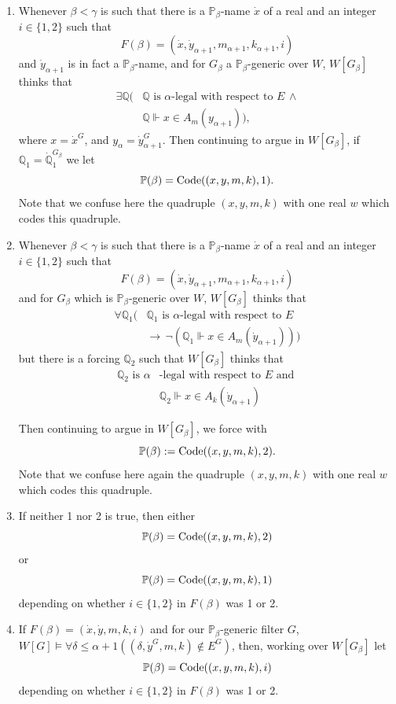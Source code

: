\documentclass[a4paper,11pt]{article}
\newcommand{\forceP}{\mathbb{P}}
\newcommand{\forceQ}{\mathbb{Q}}
\begin{document}
\begin{enumerate}
\item Whenever $\beta < \gamma $ is such that there is a $\forceP_{\beta}$-name $\dot{x}$ of a real and an integer $ i\in\{1,2\}$ such that
\[F(\beta)= (\dot{x},\dot{y}_{\alpha+1},m_{\alpha+1},k_{\alpha+1},i)\] and $\dot{y}_{\alpha+1}$ is in fact a $\forceP_{\beta}$-name, and for $G_{\beta}$  a $\forceP_{\beta}$-generic over $W$, $W[G_{\beta}]$ thinks that
\begin{align*}
\exists \forceQ (&\forceQ \text{ is } \alpha \text{-legal with respect to } E \,  \land \\& \forceQ \Vdash x \in A_m({y}_{\alpha+1})),
\end{align*}
where $x=\dot{x}^G$, and $y_{\alpha}=\dot{y}_{\alpha+1}^G$.
Then continuing to argue in $W[G_{\beta}]$, if ${\forceQ}_1=\dot{\forceQ}_1^{G_{\beta}}$ we let
\[\forceP(\beta)= \hbox{Code}((x,y,m,k),1). \]  Note that we confuse here the quadruple $(x,y,m,k)$ with one real $w$ which codes this quadruple.

\item
Whenever $\beta < \gamma $ is such that there is a $\forceP_{\beta}$-name $\dot{x}$ of a real and an integer $ i \in \{1, 2\}$ such that
\[F(\beta)= (\dot{x},\dot{y}_{\alpha+1},m_{\alpha+1},k_{\alpha+1}, i)\] and for $G_{\beta}$ which is $\forceP_{\beta}$-generic over $W$, $W[G_{\beta}]$ thinks that
\begin{align*}
\forall \forceQ_1 (&\forceQ_1 \text{ is } \alpha \text{-legal with respect to } E   \\& \rightarrow \, \lnot(\forceQ_1 \Vdash x \in A_m(\dot{y}_{\alpha+1})))
\end{align*}
but there is a forcing $\forceQ_2$ such that $W[G_{\beta}]$ thinks that 
\begin{align*}
\forceQ_{2} \text{ is } \alpha &\text{-legal with respect to $E$ and } \\ & {\forceQ_2} \Vdash x \in A_k( \dot{y}_{\alpha+1} )
\end{align*}


Then continuing to argue in $W[G_{\beta}]$, we force with
\[\forceP(\beta):= \hbox{Code}((x,y,m,k),2).\]  Note that we confuse here again the quadruple $(x,y,m,k)$ with one real $w$ which codes this quadruple.




\item If neither 1 nor 2 is true, then either \[ \forceP(\beta)=\hbox{Code}((x,y,m,k),2)\] or 
\[ \forceP(\beta)=\hbox{Code}((x,y,m,k),1)\] depending on whether $ i\in\{1,2\}$ in $F(\beta)$ was 1 or 2. 

\item 
If $F(\beta) = (\dot{x},\dot{y},m,k,i)$ and for our $\forceP_{\beta}$-generic filter $G$, $W[G] \models \forall \delta \le \alpha+1 ((\delta,\dot{y}^G,m,k) \notin E^G)$,
then, working over $W[G_{\beta}]$ let
\[ \forceP(\beta)=\hbox{Code}((x,y,m,k),i)\] depending on whether $ i\in\{1,2\}$ in $F(\beta)$ was 1 or 2.
\end{enumerate} 
\end{document}
